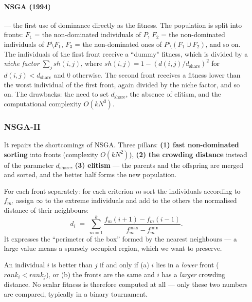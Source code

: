 \documentclass[11pt,a4paper]{article}
\theoremstyle{definition}
\providecommand{\uv}[1]{``#1''}
\begin{document}
\paragraph{NSGA (1994)} --- the first use of dominance directly as the fitness.
The population is split into fronts: $F_1$ = the non-dominated individuals of
$P$, $F_2$ = the non-dominated individuals of $P \setminus F_1$,
$F_3$ = the non-dominated ones of $P \setminus (F_1 \cup F_2)$, and so on. The
individuals of the first front receive a \uv{dummy} fitness, which is divided by
a \emph{niche factor} $\sum_j sh(i,j)$, where
$sh(i,j) = 1 - (d(i,j)/d_{\mathrm{share}})^2$ for $d(i,j) < d_{\mathrm{share}}$
and 0 otherwise. The second front receives a fitness lower than the worst
individual of the first front, again divided by the niche factor, and so on.
The drawbacks: the need to set $d_{\mathrm{share}}$, the absence of elitism, and
the computational complexity $O(kN^3)$.

\subsubsection{NSGA-II}

\begin{defbox}
It repairs the shortcomings of NSGA. Three pillars:
\textbf{(1) fast non-dominated sorting} into fronts (complexity $O(kN^2)$),
\textbf{(2) the crowding distance} instead of the parameter
$d_{\mathrm{share}}$,
\textbf{(3) elitism} --- the parents and the offspring are merged and sorted,
and the better half forms the new population.
\end{defbox}

\begin{defbox}
For each front separately: for each criterion $m$ sort the individuals according
to $f_m$, assign $\infty$ to the extreme individuals and add to the others the
normalised distance of their neighbours:
\[
d_i \;=\; \sum_{m=1}^{k}
\frac{f_m(i+1) - f_m(i-1)}{f_m^{\max} - f_m^{\min}} .
\]
It expresses the \uv{perimeter of the box} formed by the nearest neighbours ---
a large value means a sparsely occupied region, which we want to preserve.
\end{defbox}

\begin{defbox}
An individual $i$ is better than $j$ if and only if
(a) $i$ lies in a \emph{lower} front ($rank_i < rank_j$), or
(b) the fronts are the same and $i$ has a \emph{larger} crowding distance.
No scalar fitness is therefore computed at all --- only these two numbers are
compared, typically in a binary tournament.
\end{defbox}
\end{document}
